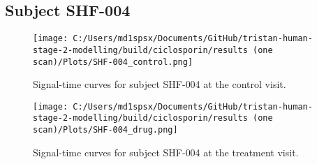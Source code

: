\documentclass{epflreport}%
\begin{document}
\subsection{Subject SHF{-}004}%
\label{subsec:SubjectSHF{-}004}%

%


\begin{figure}[h!]%
\centering%
\texttt{[image: C:/Users/md1spsx/Documents/GitHub/tristan-human-stage-2-modelling/build/ciclosporin/results (one scan)/Plots/SHF-004\_control.png]}%
\caption{Signal{-}time curves for subject SHF{-}004 at the control visit.}%
\end{figure}

%


\begin{figure}[h!]%
\centering%
\texttt{[image: C:/Users/md1spsx/Documents/GitHub/tristan-human-stage-2-modelling/build/ciclosporin/results (one scan)/Plots/SHF-004\_drug.png]}%
\caption{Signal{-}time curves for subject SHF{-}004 at the treatment visit.}%
\end{figure}
\end{document}
